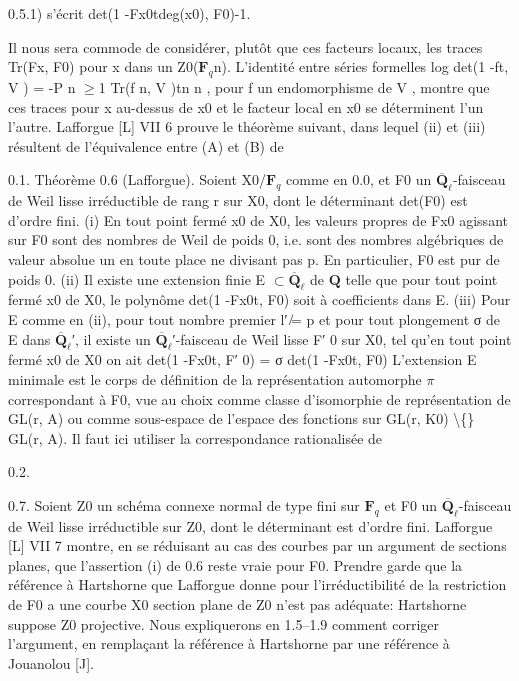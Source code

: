 \documentclass[11pt]{article}
\begin{document}
0.5.1) s’écrit det(1 -Fx0tdeg(x0), F0)-1.

Il nous sera commode de considérer, plutôt que ces facteurs locaux, les traces Tr(Fx, F0) pour x dans un Z0(\(\mathbf F_q\)n). L’identité entre séries formelles log det(1 -ft, V ) = -P n \(\ge\)1 Tr(f n, V )tn n , pour f un endomorphisme de V , montre que ces traces pour x au-dessus de x0 et le facteur local en x0 se déterminent l’un l’autre. Lafforgue [L] VII 6 prouve le théorème suivant, dans lequel (ii) et (iii) résultent de l’équivalence entre (A) et (B) de 

0.1. Théorème 0.6 (Lafforgue). Soient X0/\(\mathbf F_q\) comme en 0.0, et F0 un \(\overline{\mathbf Q}_\ell\)-faisceau de Weil lisse irréductible de rang r sur X0, dont le déterminant det(F0) est d’ordre fini. (i) En tout point fermé x0 de X0, les valeurs propres de Fx0 agissant sur F0 sont des nombres de Weil de poids 0, i.e. sont des nombres algébriques de valeur absolue un en toute place ne divisant pas p. En particulier, F0 est pur de poids 0. (ii) Il existe une extension finie E \(\subset\)\(\overline{\mathbf Q}_\ell\) de \(\mathbf Q\) telle que pour tout point fermé x0 de X0, le polynôme det(1 -Fx0t, F0) soit à coefficients dans E. (iii) Pour E comme en (ii), pour tout nombre premier l′ ̸= p et pour tout plongement σ de E dans \(\overline{\mathbf Q}_\ell\)′, il existe un \(\overline{\mathbf Q}_\ell\)′-faisceau de Weil lisse F′ 0 sur X0, tel qu’en tout point fermé x0 de X0 on ait det(1 -Fx0t, F′ 0) = σ det(1 -Fx0t, F0) L’extension E minimale est le corps de définition de la représentation automorphe \(\pi\) correspondant à F0, vue au choix comme classe d’isomorphie de représentation de GL(r, A) ou comme sous-espace de l’espace des fonctions sur GL(r, K0) \textbackslash\{\} GL(r, A). Il faut ici utiliser la correspondance rationalisée de 

0.2. 

0.7. Soient Z0 un schéma connexe normal de type fini sur \(\mathbf F_q\) et F0 un \(\overline{\mathbf Q}_\ell\)-faisceau de Weil lisse irréductible sur Z0, dont le déterminant est d’ordre fini. Lafforgue [L] VII 7 montre, en se réduisant au cas des courbes par un argument de sections planes, que l’assertion (i) de 0.6 reste vraie pour F0. Prendre garde que la référence à Hartshorne que Lafforgue donne pour l’irréductibilité de la restriction de F0 a une courbe X0 section plane de Z0 n’est pas adéquate: Hartshorne suppose Z0 projective. Nous expliquerons en 1.5--1.9 comment corriger l’argument, en remplaçant la référence à Hartshorne par une référence à Jouanolou [J].
\end{document}
